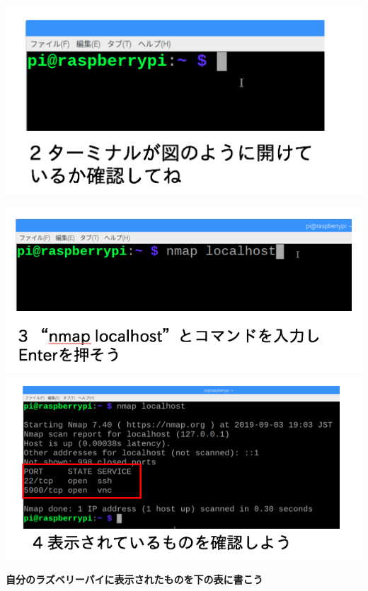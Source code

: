 \documentclass[a4paper,12pt,dvipdfmx]{jarticle}
\begin{document}
\centering
\includegraphics[width=14.508cm]{ome7-img008.png}
\flushleft


\clearpage





\centering

\includegraphics[width=14.404cm]{ome7-img032.png}
\bigskip
\includegraphics[width=14.542cm]{ome7-img031.png}
\flushleft

\bigskip
{\bfseries
	自分のラズベリーパイに表示されたものを下の表に書こう}
\end{document}
